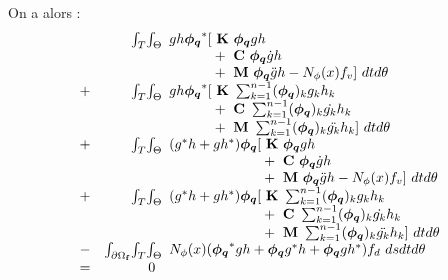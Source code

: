On a alors :
\begin{equation}
\begin{array}{r r l}
	&\int_T \! \int_\Theta \!\!\!&		
		gh\boldsymbol{\phi_q}^*
			[ ~\mathbf{K}~\boldsymbol{\phi_q} gh
			\\ && \phantom{gh\boldsymbol{\phi_q}^*[ }
			+ ~\mathbf{C}~ \boldsymbol{\phi_q}  \dot{g}h
			\\ && \phantom{gh\boldsymbol{\phi_q}^*[ }
			+ ~\mathbf{M}~ \boldsymbol{\phi_q} \ddot{g}h
			- N_\phi(x) f_v
			] ~dt d\theta
	\\
	+ &\int_T \! \int_\Theta \!\!\!&		
		gh\boldsymbol{\phi_q}^*
			[ ~\mathbf{K}~ \sum_{k=1}^{n-1} (\boldsymbol{\phi_q})_k       g_k  h_k
			\\ && \phantom{gh\boldsymbol{\phi_q}^*[}
			+ ~\mathbf{C}~ \sum_{k=1}^{n-1} (\boldsymbol{\phi_q})_k  \dot{g_k} h_k 
			\\ && \phantom{gh\boldsymbol{\phi_q}^*[}
			+ ~\mathbf{M}~ \sum_{k=1}^{n-1} (\boldsymbol{\phi_q})_k \ddot{g_k} h_k 
			] ~dt d\theta
	\\
	+ &\int_T \! \int_\Theta \!\!\!&		
		(g^*h + gh^*)\boldsymbol{\phi_q}
			[ ~\mathbf{K}~ \boldsymbol{\phi_q}gh
			\\ && \phantom{(g^*h + gh^*)\boldsymbol{\phi_q}[ }
			+ ~\mathbf{C}~ \boldsymbol{\phi_q} \dot{g}h
			\\ && \phantom{(g^*h + gh^*)\boldsymbol{\phi_q}[ }
			+ ~\mathbf{M}~ \boldsymbol{\phi_q} \ddot{g}h
			- N_\phi(x) f_v
			] ~dt d\theta
	\\
	+ &\int_T \! \int_\Theta \!\!\!&
		(g^*h + gh^*)\boldsymbol{\phi_q}
			[ ~\mathbf{K}~ \sum_{k=1}^{n-1} (\boldsymbol{\phi_q})_k      {g_k} h_k 
			\\ && \phantom{(g^*h + gh^*)\boldsymbol{\phi_q}[}
			+ ~\mathbf{C}~ \sum_{k=1}^{n-1} (\boldsymbol{\phi_q})_k  \dot{g_k} h_k 
			\\ && \phantom{(g^*h + gh^*)\boldsymbol{\phi_q}[}
			+ ~\mathbf{M}~ \sum_{k=1}^{n-1} (\boldsymbol{\phi_q})_k \ddot{g_k} h_k 
			] ~dt d\theta
	\\
	- &\int_{\partial \Omega_\mathbf{f}} \! \int_T \! \int_\Theta \!\!\!&
		N_\phi(x)(\boldsymbol{\phi_q}^*gh + \boldsymbol{\phi_q} g^*h + \boldsymbol{\phi_q} gh^*) f_d  ~ds dt d\theta
	\\
	= &0& 
\end{array}
\end{equation}

